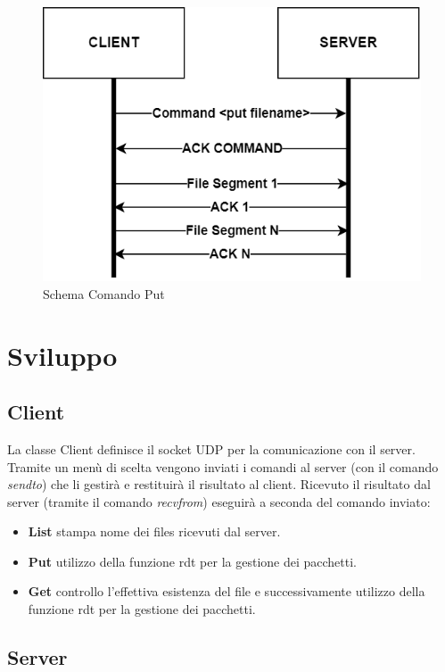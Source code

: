 \documentclass{article}
\begin{document}
\begin{figure}[!htb]
  \includegraphics[width=\linewidth]{commandPut.png}
  \caption{Schema Comando Put}
\end{figure}

\newpage
\section{Sviluppo}
\subsection{Client}


La classe Client definisce il socket UDP per la comunicazione con il server.
Tramite un menù di scelta vengono inviati i comandi al server (con il comando  \textit{sendto}) che li gestirà e restituirà il risultato al client.
Ricevuto il risultato dal server (tramite il comando \textit{recvfrom}) eseguirà a seconda del comando inviato:
\begin{itemize}
    \item \textbf{List} stampa nome dei files ricevuti dal server.
    \item \textbf{Put} utilizzo della funzione rdt per la gestione dei pacchetti.
    \item \textbf{Get} controllo l'effettiva esistenza del file e successivamente utilizzo della funzione rdt per la gestione dei pacchetti.
\end{itemize}

\subsection{Server}
\end{document}
